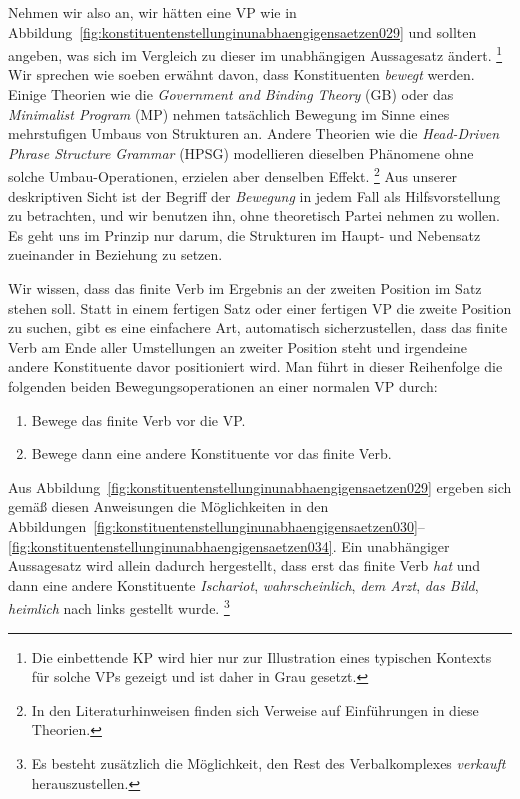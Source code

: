 Nehmen wir also an, wir hätten eine VP wie in Abbildung~\ref{fig:konstituentenstellunginunabhaengigensaetzen029} und sollten angeben, was sich im Vergleich zu dieser im unabhängigen Aussagesatz ändert.%
\footnote{Die einbettende KP wird hier nur zur Illustration eines typischen Kontexts für solche VPs gezeigt und ist daher in Grau gesetzt.}
Wir sprechen wie soeben erwähnt davon, dass Konstituenten \textit{bewegt} werden.
Einige Theorien wie \zB die \textit{Government and Binding Theory} (GB) oder das \textit{Minimalist Program} (MP) nehmen tatsächlich Bewegung im Sinne eines mehrstufigen Umbaus von Strukturen an.
Andere Theorien wie die \textit{Head-Driven Phrase Structure Grammar} (HPSG) modellieren dieselben Phänomene ohne solche Umbau-Operationen, erzielen aber denselben Effekt.%
\footnote{In den Literaturhinweisen finden sich Verweise auf Einführungen in diese Theorien.}
Aus unserer deskriptiven Sicht ist der Begriff der \textit{Bewegung} in jedem Fall als Hilfsvorstellung zu betrachten, und wir benutzen ihn, ohne theoretisch Partei nehmen zu wollen.
Es geht uns im Prinzip nur darum, die Strukturen im Haupt- und Nebensatz zueinander in Beziehung zu setzen.

Wir wissen, dass das finite Verb im Ergebnis an der zweiten Position im Satz stehen soll.
Statt in einem fertigen Satz oder einer fertigen VP die zweite Position zu suchen, gibt es eine einfachere Art, automatisch sicherzustellen, dass das finite Verb am Ende aller Umstellungen an zweiter Position steht und irgendeine andere Konstituente davor positioniert wird.
Man führt in dieser Reihenfolge die folgenden beiden Bewegungsoperationen an einer normalen VP durch:

\begin{enumerate}
  \item Bewege das finite Verb vor die VP.
  \item Bewege dann eine andere Konstituente vor das finite Verb.
\end{enumerate}

Aus Abbildung~\ref{fig:konstituentenstellunginunabhaengigensaetzen029} ergeben sich gemäß diesen Anweisungen die Möglichkeiten in den Abbildungen~\ref{fig:konstituentenstellunginunabhaengigensaetzen030}--\ref{fig:konstituentenstellunginunabhaengigensaetzen034}.
Ein unabhängiger Aussagesatz wird allein dadurch hergestellt, dass erst das finite Verb \textit{hat} und dann eine andere Konstituente \textit{Ischariot}, \textit{wahrscheinlich}, \textit{dem Arzt}, \textit{das Bild}, \textit{heimlich} nach links gestellt wurde.%
\footnote{Es besteht zusätzlich die Möglichkeit, den Rest des Verbalkomplexes \textit{verkauft} herauszustellen.}

